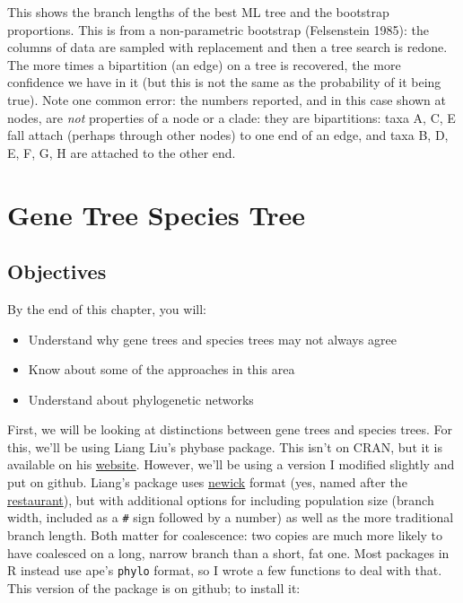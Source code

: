 \documentclass[]{article}
\providecommand{\tightlist}{%
  \setlength{\itemsep}{0pt}\setlength{\parskip}{0pt}}
\begin{document}
This shows the branch lengths of the best ML tree and the bootstrap proportions. This is from a non-parametric bootstrap (Felsenstein 1985): the columns of data are sampled with replacement and then a tree search is redone. The more times a bipartition (an edge) on a tree is recovered, the more confidence we have in it (but this is not the same as the probability of it being true). Note one common error: the numbers reported, and in this case shown at nodes, are \emph{not} properties of a node or a clade: they are bipartitions: taxa A, C, E fall attach (perhaps through other nodes) to one end of an edge, and taxa B, D, E, F, G, H are attached to the other end.

\hypertarget{gene-tree-species-tree}{%
\section{Gene Tree Species Tree}\label{gene-tree-species-tree}}

\hypertarget{objectives-7}{%
\subsection{Objectives}\label{objectives-7}}

By the end of this chapter, you will:

\begin{itemize}
\tightlist
\item
  Understand why gene trees and species trees may not always agree
\item
  Know about some of the approaches in this area
\item
  Understand about phylogenetic networks
\end{itemize}

First, we will be looking at distinctions between gene trees and species trees. For this, we'll be using Liang Liu's phybase package. This isn't on CRAN, but it is available on his \href{https://faculty.franklin.uga.edu/lliu/content/phybase?}{website}. However, we'll be using a version I modified slightly and put on github. Liang's package uses \href{http://evolution.genetics.washington.edu/phylip/newicktree.html}{newick} format (yes, named after the \href{http://newicks.com}{restaurant}), but with additional options for including population size (branch width, included as a \texttt{\#} sign followed by a number) as well as the more traditional branch length. Both matter for coalescence: two copies are much more likely to have coalesced on a long, narrow branch than a short, fat one. Most packages in R instead use ape's \texttt{phylo} format, so I wrote a few functions to deal with that. This version of the package is on github; to install it:
\end{document}
